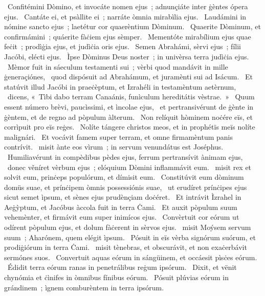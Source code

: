 ~Confitémini Dòmino, et invocáte nomen ejus~; adnunçiáte inter ġèntes ópera ejus. 
~Cantáte ei, et psàllite ei~; narráte òmnia mirabìlia ejus. 
~Laudámini in nómine sancto ejus~; laetétur cor quaerèntium Dòminum. 
~Quaerite Dòminum, et confirmámini~; quáerite fàċiem ejus sèmper. 
~Mementóte mirabílium ejus quae feċit~; prodìġia ejus, et judìċia oris ejus. 
~Semen Abrahámi, sèrvi ejus~; fílii Jacóbi, elécti ejus. 
~Ìpse Dòminus Deus noster~; in univèrsa terra judìċia ejus. 
~Mèmor fuit in sáeculum testamenti sui~; vèrbi quod mandávit in mille ġeneraçiónes, 
~quod dispósuit ad Abrahámum, et juramènti sui ad Isácum. 
~Et statúvit illud Jacóbi in praeċèptum, et Izrahéli in testamèntum aetèrnum, 
~dicens, «~Tìbi dabo terram Canaánis, funìculum hereditátis vèstrae.~» 
~Quum essent número brèvi, paucìssimi, et ìncolae ejus, 
~et pertransivérunt de ġènte in ġèntem, et de regno ad pòpulum àlterum. 
~Non relíquit hòminem noċére eïs, et corrìpuit pro eïs reġes. 
~Nolíte tángere christos meos, et in prophétïs meïs nolíte malignári. 
~Et vocávit famem super terram, et omne firmamèntum panis contrívit. 
~misit ànte eos vìrum~; in servum venundátus est Joséphus. 
~Humiliavérunt in compèdibus pèdes ejus, ferrum pertransívit ànimam ejus, 
~donec věníret vèrbum ejus~; elóquium Dòmini inflammávit eum. 
~misit rex et solvit eum, prinċeps populórum, et dímisit eum. 
~Constitúvit eum dòminum domüs suae, et prínċipem òmnis possessiónis suae, 
~ut erudíret prínċipes ejus sicut semet ìpsum, et sènes ejus prudènçiam doċéret. 
~Et intrávit Ìzrahel in Aeġỳptum, et Jacóbus àccola fuit in terra Ċami. 
~Et auxit pòpulum suum vehemènter, et firmávit eum super inimícos ejus. 
~Convèrtuit cor eórum ut odírent pòpulum ejus, et dolum fàċerent in sèrvos ejus. 
~misit Moýsem servum suum~; Aharónem, quem elégit ìpsum. 
~Pósuit in eïs vèrba signórum suórum, et prodiġiórum in terra Ċami. 
~misit tènebras, et obscurávit, et non exaċerbávit sermónes suos. 
~Convertuit aquas eórum in sángüinem, et occáesit pìsċes eórum. 
~Édidit terra eórum ranas in penetrálibus reġum ipsórum. 
~Dixit, et vënit chynómia et ċìnifes in òmnibus fínibus eórum. 
~Pósuit plúvias eórum in grándinem~; ìgnem comburèntem in terra ipsórum. 
